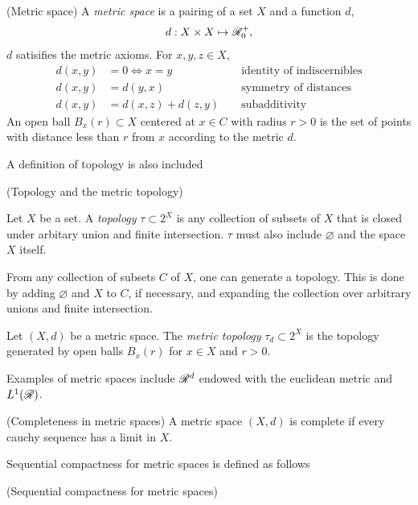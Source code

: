 \begin{definition}
\begin{definition}(Metric space)
	A \emph{metric space} is a pairing of a set $X$ and a function $d$,  
	\begin{align}
		d : X \times X \mapsto \mathscr{R}^+_0, 
	\end{align}
	$d$ satisifies the metric axioms. For $x,y,z \in X$, 
	\begin{align}
		d(x,y) &= 0 \iff x = y \,\, &&\text{identity of indiscernibles} \\
		d(x,y) &= d(y,x) \ \,\, &&\text{symmetry of distances} \\
		d(x,y) &= d(x,z) + d(z,y)  \,\, &&\text{subadditivity}
	\end{align}
	An open ball $B_x(r) \subset X$ centered at $x \in C$ with radius $r > 0$ is
	the set of points with distance less than $r$ from $x$ according to the metric $d$. 
\end{definition}

A definition of topology is also included 

\begin{definition}(Topology and the metric topology)
	
	Let $X$ be a set. A \emph{topology} $\tau \subset 2^X$ is any collection of subsets of $X$ that is closed under arbitary union and finite intersection. $\tau$ must also include $\varnothing$ and the space $X$ itself. 
	
	From any collection of subsets $C$ of $X$, one can generate a topology. This is done by adding $\varnothing$ and $X$ to $C$, if necessary, and expanding the collection over arbitrary unions and finite intersection. 
	
	Let $(X,d)$ be a metric space. The \emph{metric topology} $\tau_d \subset 2^X$ is the topology generated by open balls $B_x(r)$ for $x \in X$ and $r > 0$. 
\end{definition}

Examples of metric spaces include $\mathscr{R}^d$ endowed with the euclidean metric and $L^1(\mathscr{R})$. 

\begin{definition} (Completeness in metric spaces)
	A metric space $(X,d)$ is complete if every cauchy sequence has a limit in $X$. 
\end{definition}



Sequential compactness for metric spaces is defined as follows

\begin{definition}(Sequential compactness for metric spaces)
	

\end{definition}
\end{definition}
